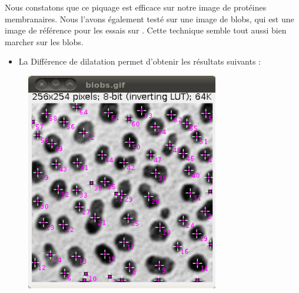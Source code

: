 Nous constatons que ce piquage est efficace sur notre image de protéines membranaires. Nous l'avons également testé sur une image de blobs, qui est une image de référence pour les essais sur \imj. Cette technique semble tout aussi bien marcher sur les blobs. \\

\begin{itemize}{•}
\item La Différence de dilatation permet d'obtenir les résultats suivants :
\end{itemize}

\begin{figure}[!ht]
\begin{center}
 \begin{minipage}{.450\linewidth}
  \includegraphics[width=0.75\textwidth]{blobDilate.png}  
 \end{minipage} \hfill
\begin{minipage}{.450\linewidth}

\end{minipage}
\end{center}
\end{figure}
